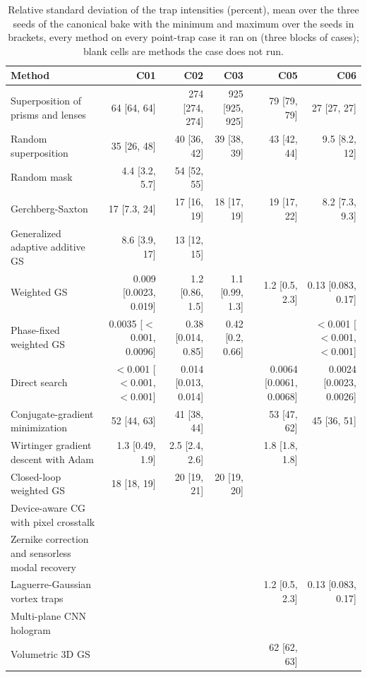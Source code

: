 \begingroup\scriptsize\setlength{\tabcolsep}{2pt}
\begin{longtable}{@{}>{\raggedright\arraybackslash}p{} rrrrr@{}}
\caption{Relative standard deviation of the trap intensities (percent), mean over the three seeds of the canonical bake with the minimum and maximum over the seeds in brackets, every method on every point-trap case it ran on (three blocks of cases); blank cells are methods the case does not run.}\label{tab:bake-sigma}\\
\toprule Method & C01 & C02 & C03 & C05 & C06\\
\midrule
Superposition of prisms and lenses & 64 [64, 64] & 274 [274, 274] & 925 [925, 925] & 79 [79, 79] & 27 [27, 27]\\
Random superposition & 35 [26, 48] & 40 [36, 42] & 39 [38, 39] & 43 [42, 44] & 9.5 [8.2, 12]\\
Random mask & 4.4 [3.2, 5.7] & 54 [52, 55] &  &  & \\
Gerchberg-Saxton & 17 [7.3, 24] & 17 [16, 19] & 18 [17, 19] & 19 [17, 22] & 8.2 [7.3, 9.3]\\
Generalized adaptive additive GS & 8.6 [3.9, 17] & 13 [12, 15] &  &  & \\
Weighted GS & 0.009 [0.0023, 0.019] & 1.2 [0.86, 1.5] & 1.1 [0.99, 1.3] & 1.2 [0.5, 2.3] & 0.13 [0.083, 0.17]\\
Phase-fixed weighted GS & 0.0035 [$<$0.001, 0.0096] & 0.38 [0.014, 0.85] & 0.42 [0.2, 0.66] &  & $<$0.001 [$<$0.001, $<$0.001]\\
Direct search & $<$0.001 [$<$0.001, $<$0.001] & 0.014 [0.013, 0.014] &  & 0.0064 [0.0061, 0.0068] & 0.0024 [0.0023, 0.0026]\\
Conjugate-gradient minimization & 52 [44, 63] & 41 [38, 44] &  & 53 [47, 62] & 45 [36, 51]\\
Wirtinger gradient descent with Adam & 1.3 [0.49, 1.9] & 2.5 [2.4, 2.6] &  & 1.8 [1.8, 1.8] & \\
Closed-loop weighted GS & 18 [18, 19] & 20 [19, 21] & 20 [19, 20] &  & \\
Device-aware CG with pixel crosstalk &  &  &  &  & \\
Zernike correction and sensorless modal recovery &  &  &  &  & \\
Laguerre-Gaussian vortex traps &  &  &  & 1.2 [0.5, 2.3] & 0.13 [0.083, 0.17]\\
Multi-plane CNN hologram &  &  &  &  & \\
Volumetric 3D GS &  &  &  & 62 [62, 63] & \\

\end{longtable}
